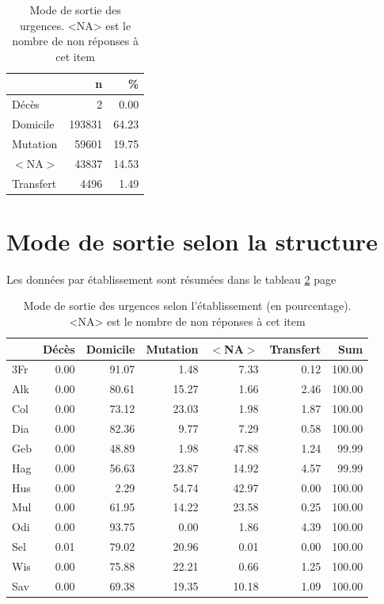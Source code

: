 \documentclass[12pt,english,french,twoside]{report}\usepackage[]{graphicx}\usepackage[]{color}
\begin{document}
\begin{table}[ht]
\centering
\begin{tabular}{|l|r|r|}
  \hline
 & n & \% \\ 
  \hline
Décès & 2 & 0.00 \\ 
  Domicile & 193831 & 64.23 \\ 
  Mutation & 59601 & 19.75 \\ 
  $<$NA$>$ & 43837 & 14.53 \\ 
  Transfert & 4496 & 1.49 \\ 
   \hline
\end{tabular}
\caption[Mode de sortie des urgences]{Mode de sortie des urgences. <NA> est le nombre de non réponses à cet item} 
\label{tab.sortie}
\end{table}



\section{Mode de sortie selon la structure}

Les données par établissement sont résumées dans le tableau \ref{tab.sortie_etab} page \pageref{tab.sortie_etab}

\begin{table}[ht]
\centering
\begin{tabular}{|l|r|r|r|r|r|r|}
  \hline
 & Décès & Domicile & Mutation & $<$NA$>$ & Transfert & Sum \\ 
  \hline
3Fr & 0.00 & 91.07 & 1.48 & 7.33 & 0.12 & 100.00 \\ 
  Alk & 0.00 & 80.61 & 15.27 & 1.66 & 2.46 & 100.00 \\ 
  Col & 0.00 & 73.12 & 23.03 & 1.98 & 1.87 & 100.00 \\ 
  Dia & 0.00 & 82.36 & 9.77 & 7.29 & 0.58 & 100.00 \\ 
  Geb & 0.00 & 48.89 & 1.98 & 47.88 & 1.24 & 99.99 \\ 
  Hag & 0.00 & 56.63 & 23.87 & 14.92 & 4.57 & 99.99 \\ 
  Hus & 0.00 & 2.29 & 54.74 & 42.97 & 0.00 & 100.00 \\ 
  Mul & 0.00 & 61.95 & 14.22 & 23.58 & 0.25 & 100.00 \\ 
  Odi & 0.00 & 93.75 & 0.00 & 1.86 & 4.39 & 100.00 \\ 
  Sel & 0.01 & 79.02 & 20.96 & 0.01 & 0.00 & 100.00 \\ 
  Wis & 0.00 & 75.88 & 22.21 & 0.66 & 1.25 & 100.00 \\ 
  Sav & 0.00 & 69.38 & 19.35 & 10.18 & 1.09 & 100.00 \\ 
   \hline
\end{tabular}
\caption[Mode de sortie selon l'établissement]{Mode de sortie des urgences selon l'établissement (en pourcentage). <NA> est le nombre de non réponses à cet item} 
\label{tab.sortie_etab}
\end{table}
\end{document}
